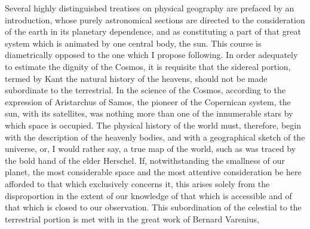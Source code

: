 Several highly distinguished treatises on physical geography are prefaced by an introduction, whose purely astronomical sections are directed to the consideration of the earth in its planetary dependence, and as constituting a part of that great system which is animated by one central body, the sun. This course is diametrically opposed to the one which I propose following. In order adequately to estimate the dignity of the Cosmos, it is requisite that the sidereal portion, termed by Kant the natural history of the heavens, should not be made subordinate to the terrestrial. In the science of the Cosmos, according to the expression of Aristarchus of Samos, the pioneer of the Copernican system, the sun, with its satellites, was nothing more than one of the innumerable stars by which space is occupied. The physical history of the world must, therefore, begin with the description of the heavenly bodies, and with a geographical sketch of the universe, or, I would rather say, a true map of the world, such as was traced by the bold hand of the elder Herschel. If, notwithstanding the smallness of our planet, the most considerable space and the most attentive consideration be here afforded to that which exclusively concerns it, this arises solely from the disproportion in the extent of our knowledge of that which is accessible and of that which is closed to our observation. This subordination of the celestial to the terrestrial portion is met with in the great work of Bernard Varenius,
